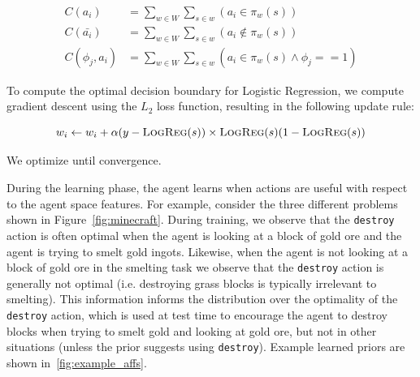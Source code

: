 \documentclass[11pt]{article}
\begin{document}
\begin{align}
C(a_i) &= \sum_{w \in W} \sum_{s \in w} (a_i \in \pi_w(s)) \\
C(\bar{a_i}) &= \sum_{w \in W} \sum_{s \in w} (a_i \not \in \pi_w(s) ) \\
C(\phi_j, a_i) &= \sum_{w \in W} \sum_{s \in w} (a_i  \in \pi_w(s) \wedge \phi_j == 1)
\end{align}

To compute the optimal decision boundary for Logistic Regression, we compute gradient descent using the $L_2$ loss function, resulting in the following update rule:

\begin{equation}
w_i \leftarrow w_i + \alpha(y - \textsc{LogReg}(s)) \times \textsc{LogReg}(s)(1 - \textsc{LogReg}(s))
\end{equation}

We optimize until convergence.


During the learning phase, the agent learns when actions are useful
with respect to the agent space features.  For example, consider the three different
problems shown in Figure~\ref{fig:minecraft}.  During training, we observe
that the \texttt{destroy} action is often optimal when the agent is
looking at a block of gold ore and the agent is trying to smelt gold
ingots.  Likewise, when the agent is not looking at a block of gold
ore in the smelting task we observe that the \texttt{destroy} action
is generally not optimal (i.e. destroying grass blocks is typically
irrelevant to smelting).  This information informs the distribution
over the optimality of the \texttt{destroy} action, which is used at
test time to encourage the agent to destroy blocks when trying to
smelt gold and looking at gold ore, but not in other situations
(unless the prior suggests using \texttt{destroy}). Example
learned priors are shown in~\ref{fig:example_affs}.
\end{document}
